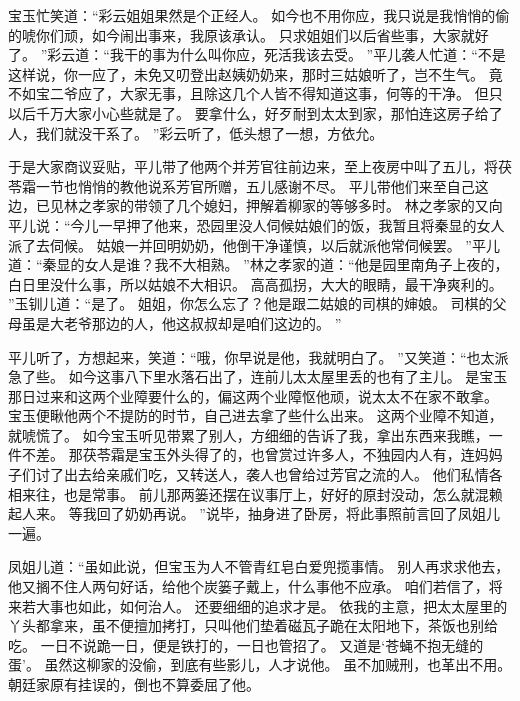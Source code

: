 宝玉忙笑道：“彩云姐姐果然是个正经人。
如今也不用你应，我只说是我悄悄的偷的唬你们顽，如今闹出事来，我原该承认。
只求姐姐们以后省些事，大家就好了。
”彩云道：“我干的事为什么叫你应，死活我该去受。
”平儿袭人忙道：“不是这样说，你一应了，未免又叨登出赵姨奶奶来，那时三姑娘听了，岂不生气。
竟不如宝二爷应了，大家无事，且除这几个人皆不得知道这事，何等的干净。
但只以后千万大家小心些就是了。
要拿什么，好歹耐到太太到家，那怕连这房子给了人，我们就没干系了。
”彩云听了，低头想了一想，方依允。
\par
于是大家商议妥贴，平儿带了他两个并芳官往前边来，至上夜房中叫了五儿，将茯苓霜一节也悄悄的教他说系芳官所赠，五儿感谢不尽。
平儿带他们来至自己这边，已见林之孝家的带领了几个媳妇，押解着柳家的等够多时。
林之孝家的又向平儿说：“今儿一早押了他来，恐园里没人伺候姑娘们的饭，我暂且将秦显的女人派了去伺候。
姑娘一并回明奶奶，他倒干净谨慎，以后就派他常伺候罢。
”平儿道：“秦显的女人是谁？我不大相熟。
”林之孝家的道：“他是园里南角子上夜的，白日里没什么事，所以姑娘不大相识。
高高孤拐，大大的眼睛，最干净爽利的。
”玉钏儿道：“是了。
姐姐，你怎么忘了？他是跟二姑娘的司棋的婶娘。
司棋的父母虽是大老爷那边的人，他这叔叔却是咱们这边的。
”\par
平儿听了，方想起来，笑道：“哦，你早说是他，我就明白了。
”又笑道：“也太派急了些。
如今这事八下里水落石出了，连前儿太太屋里丢的也有了主儿。
是宝玉那日过来和这两个业障要什么的，偏这两个业障怄他顽，说太太不在家不敢拿。
宝玉便瞅他两个不提防的时节，自己进去拿了些什么出来。
这两个业障不知道，就唬慌了。
如今宝玉听见带累了别人，方细细的告诉了我，拿出东西来我瞧，一件不差。
那茯苓霜是宝玉外头得了的，也曾赏过许多人，不独园内人有，连妈妈子们讨了出去给亲戚们吃，又转送人，袭人也曾给过芳官之流的人。
他们私情各相来往，也是常事。
前儿那两篓还摆在议事厅上，好好的原封没动，怎么就混赖起人来。
等我回了奶奶再说。
”说毕，抽身进了卧房，将此事照前言回了凤姐儿一遍。
\par
凤姐儿道：“虽如此说，但宝玉为人不管青红皂白爱兜揽事情。
别人再求求他去，他又搁不住人两句好话，给他个炭篓子戴上，什么事他不应承。
咱们若信了，将来若大事也如此，如何治人。
还要细细的追求才是。
依我的主意，把太太屋里的丫头都拿来，虽不便擅加拷打，只叫他们垫着磁瓦子跪在太阳地下，茶饭也别给吃。
一日不说跪一日，便是铁打的，一日也管招了。
又道是‘苍蝇不抱无缝的蛋’。
虽然这柳家的没偷，到底有些影儿，人才说他。
虽不加贼刑，也革出不用。
朝廷家原有挂误的，倒也不算委屈了他。
